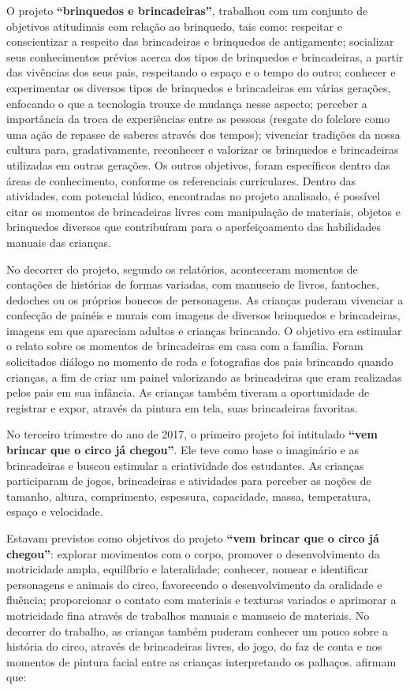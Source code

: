 \begin{refsection}
    O projeto \textbf{“brinquedos e brincadeiras”}, trabalhou com um conjunto de objetivos atitudinais com relação ao brinquedo, tais como: respeitar e conscientizar a respeito das brincadeiras e brinquedos de antigamente; socializar seus conhecimentos prévios acerca dos tipos de brinquedos e brincadeiras, a partir das vivências dos seus pais, respeitando o espaço e o tempo do outro; conhecer e experimentar os diversos tipos de brinquedos e brincadeiras em várias gerações, enfocando o que a tecnologia trouxe de mudança nesse aspecto; perceber a importância da troca de experiências entre as pessoas (resgate do folclore como uma ação de repasse de saberes através dos tempos); vivenciar tradições da nossa cultura para, gradativamente, reconhecer e valorizar os brinquedos e brincadeiras utilizadas em outras gerações. Os outros objetivos, foram específicos dentro das áreas de conhecimento, conforme os referenciais curriculares. Dentro das atividades, com potencial lúdico, encontradas no projeto analisado, é possível citar os momentos de brincadeiras livres com manipulação de materiais, objetos e brinquedos diversos que contribuíram para o aperfeiçoamento das habilidades manuais das crianças. 

    No decorrer do projeto, segundo os relatórios, aconteceram momentos de contações de histórias de formas variadas, com manuseio de livros, fantoches, dedoches ou os próprios bonecos de personagens. As crianças puderam vivenciar a confecção de painéis e murais com imagens de diversos brinquedos e brincadeiras, imagens em que apareciam adultos e crianças brincando. O objetivo era estimular o relato sobre os momentos de brincadeiras em casa com a família. Foram solicitados diálogo no momento de roda e fotografias dos pais brincando quando crianças, a fim de criar um painel valorizando as brincadeiras que eram realizadas pelos pais em sua infância. As crianças também tiveram a oportunidade de registrar e expor, através da pintura em tela, suas brincadeiras favoritas.  

    No terceiro trimestre do ano de 2017, o primeiro projeto foi intitulado \textbf{“vem brincar que o circo já chegou”}. Ele teve como base o imaginário e as brincadeiras e buscou estimular a criatividade dos estudantes. As crianças participaram de jogos, brincadeiras e atividades para perceber as noções de tamanho, altura, comprimento, espessura, capacidade, massa, temperatura, espaço e velocidade. 

    Estavam previstos como objetivos do projeto \textbf{“vem brincar que o circo já chegou”}: explorar movimentos com o corpo, promover o desenvolvimento da motricidade ampla, equilíbrio e lateralidade; conhecer, nomear e identificar personagens e animais do circo, favorecendo o desenvolvimento da oralidade e fluência; proporcionar o contato com materiais e texturas variados e aprimorar a motricidade fina através de trabalhos manuais e manuseio de materiais. No decorrer do trabalho, as crianças também puderam conhecer um pouco sobre a história do circo, através de brincadeiras livres, do jogo, do faz de conta e nos momentos de pintura facial entre as crianças interpretando os palhaços. \textcite{MODESTOAndRUBIO2014importância} afirmam que: 


\end{refsection}
